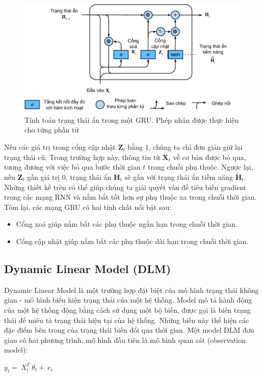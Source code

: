 \documentclass[conference]{IEEEtran}
\begin{document}
\begin{figure}[H]
    \centering
    \begin{minipage}{0.23\textwidth}
        \centering
        \includegraphics[width=1\textwidth]{bibliography/figure/GRU/gru_3.pdf}
        \caption{Tính toán trạng thái ẩn trong một GRU. Phép nhân được thực hiện cho từng phần tử}
        \label{fig:gru_up}
    \end{minipage}

\end{figure}

Nếu các giá trị trong cổng cập nhật $\mathbf{Z}_t$ bằng 1, chúng ta chỉ đơn giản giữ lại trạng thái cũ. Trong trường hợp này, thông tin từ $\mathbf{X}_t$ về cơ bản được bỏ qua, tương đương với việc bỏ qua bước thời gian $t$ trong chuỗi phụ thuộc. Ngược lại, nếu $\mathbf{Z}_t$ gần giá trị 0, trạng thái ẩn $\mathbf{H}_t$ sẽ gần với trạng thái ẩn tiềm năng $\tilde{\mathbf{H}}_t$. Những thiết kế trên có thể giúp chúng ta giải quyết vấn đề tiêu biến gradient trong các mạng RNN và nắm bắt tốt hơn sự phụ thuộc xa trong chuỗi thời gian. Tóm lại, các mạng GRU có hai tính chất nổi bật sau:

\begin{itemize}
    \item Cổng xoá giúp nắm bắt các phụ thuộc ngắn hạn trong chuỗi thời gian.
    \item Cổng cập nhật giúp nắm bắt các phụ thuộc dài hạn trong chuỗi thời gian.
\end{itemize}

\subsection{Dynamic Linear Model (DLM)}
Dynamic Linear Model là một trường hợp đặt biệt của mô hình trạng thái không gian - mô hình biểu hiện trạng thái của một hệ thống. Model mô tả hành động của một hệ thống động bằng cách sử dụng một bộ biến, được gọi là biến trạng thái để miêu tả trạng thái hiện tại của hệ thống. Những biến này thể hiện các đặc điểm bên trong của trạng thái biến đổi qua thời gian.
Một model DLM đơn gian có hai phương trình, mô hình đầu tiên là mô hình quan sát (observation model):
\begin{center}

    \(y_t=\ X_i^T\ \theta_t+\ e_i\)

\end{center}
\end{document}
